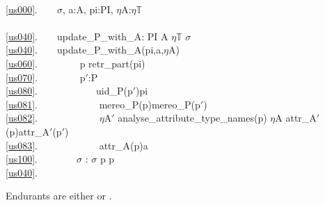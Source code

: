 \mnewfoil\LLLL\HHHH

%
\bp
{}\\
\ref{us000}.\ \ \ \ $\sigma$, a:A, pi:PI, $\eta$A:$\eta$$\mathbb{T}$\\
\\
\ref{us040}.\ \ \ \ update\_P\_with\_A: PI {\TIMES} A {\TIMES} $\eta\mathbb{T}$ {\RIGHTARROW}  $\sigma$ \label{updatePwithA}\ \ \\
\ref{us040}.\ \ \ \ update\_P\_with\_A(pi,a,$\eta$A) {\IS}\\
\ref{us060}.\ \ \ \ \ \ \ \  p {\EQ} retr\_part(pi) \\
\ref{us070}.\ \ \ \ \ \ \ \  p$'$:P {\RDOT}\ \ \\
\ref{us080}.\ \ \ \ \ \ \ \ \ \ \ \ uid\_P(p$'$){\EQ}pi \\
\ref{us081}.\ \ \ \ \ \ \ \ \ \ \ \ {\WEDGE} mereo\_P(p){\EQ}mereo\_P(p$'$)\\
\ref{us082}.\ \ \ \ \ \ \ \ \ \ \ \ {\WEDGE} {\ALL} $\eta$A$'$ {\ISIN} analyse\_attribute\_type\_names(p) {\SETMINUS} {\LBRACE}$\eta$A{\RBRACE} {\DBLRIGHTARROW} attr\_A$'$(p){\EQ}attr\_A$'$(p$'$)\\
\ref{us083}.\ \ \ \ \ \ \ \ \ \ \ \ {\WEDGE} attr\_A(p{\PRIM}){\EQ}a \\
\ref{us100}.\ \ \ \ \ \ \ \ $\sigma$ :{\EQ} $\sigma$ {\SETMINUS} {\LBRACE}p{\RBRACE} {\UNION} {\LBRACE}p{\PRIM}{\RBRACE}\\
\ref{us040}.\ \ \ \ \ \ \ \  
\ep

     
\label{Stationary and Mobile Attributes}%



\begynd
\pind  Endurants are either  or
       . 
\afslut

